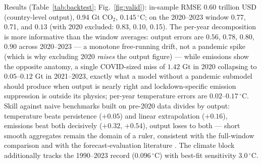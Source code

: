 \documentclass[a4paper,fleqn]{cas-sc}
\begin{document}
Results (Table~\ref{tab:backtest}; Fig.~\ref{fig:valid}): in-sample RMSE 0.60 trillion USD
(country-level output), 0.94 Gt CO$_2$, $0.145\,^{\circ}$C; on the 2020--2023 window 0.77, 0.71,
and $0.13$ (with 2020 excluded: 0.83, 0.10, 0.15). The per-year decomposition is more
informative than the window averages: output errors are $0.56$, $0.78$, $0.80$, $0.90$ across
2020--2023 --- a monotone free-running drift, not a pandemic spike (which is why excluding 2020
\emph{raises} the output figure) --- while emissions show the opposite anatomy, a single
COVID-sized miss of $1.42$ Gt in 2020 collapsing to $0.05$--$0.12$ Gt in 2021--2023, exactly
what a model without a pandemic submodel should produce when output is nearly right and
lockdown-specific emission suppression is outside its physics; per-year temperature errors are
$0.02$--$0.17\,^{\circ}$C. Skill against naive benchmarks built on pre-2020 data divides
by output: temperature beats persistence ($+0.05$) and linear extrapolation ($+0.16$), emissions
beat both decisively ($+0.32$, $+0.54$), output loses to both --- short smooth aggregates remain
the domain of a ruler, consistent with the full-window comparison and with the
forecast-evaluation literature \citep{celasun2021}. The climate block additionally tracks the
1990--2023 record ($0.096\,^{\circ}$C) with best-fit sensitivity $3.0\,^{\circ}$C.
\end{document}
